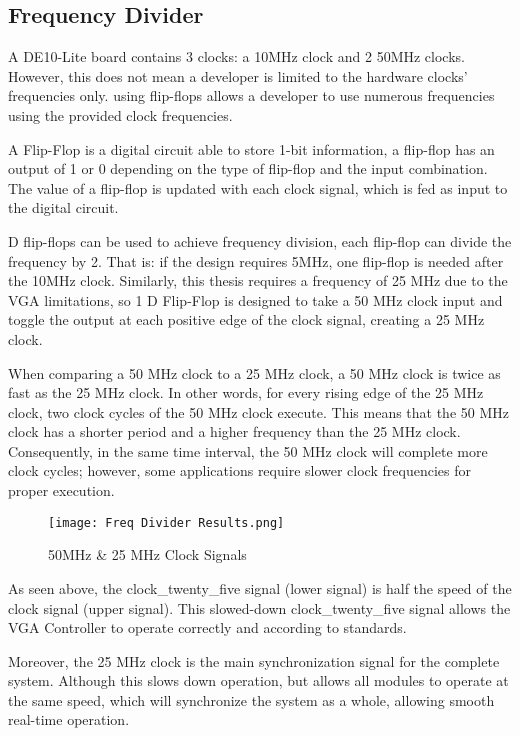 \subsection{Frequency Divider}
\par A DE10-Lite board contains 3 clocks: a 10MHz clock and 2 50MHz clocks. However, this does not mean a developer is limited to the hardware clocks' frequencies only. using flip-flops allows a developer to use numerous frequencies using the provided clock frequencies. \newline
\par A Flip-Flop is a digital circuit able to store 1-bit information, a flip-flop has an output of 1 or 0 depending on the type of flip-flop and the input combination. The value of a flip-flop is updated with each clock signal, which is fed as input to the digital circuit. \newline
\par D flip-flops can be used to achieve frequency division, each flip-flop can divide the frequency by 2. That is: if the design requires 5MHz, one flip-flop is needed after the 10MHz clock. Similarly, this thesis requires a frequency of 25 MHz due to the VGA limitations, so 1 D Flip-Flop is designed to take a 50 MHz clock input and toggle the output at each positive edge of the clock signal, creating a 25 MHz clock. \newline
\par When comparing a 50 MHz clock to a 25 MHz clock, a 50 MHz clock is twice as fast as the 25 MHz clock. In other words, for every rising edge of the 25 MHz clock, two clock cycles of the 50 MHz clock execute. This means that the 50 MHz clock has a shorter period and a higher frequency than the 25 MHz clock. Consequently, in the same time interval, the 50 MHz clock will complete more clock cycles; however, some applications require slower clock frequencies for proper execution. \newline

\begin{figure}[H]
    \centering
    \texttt{[image: Freq Divider Results.png]}
    \caption{50MHz \& 25 MHz Clock Signals }
    \label{fig:5025Res}  
\end{figure}

\par As seen above, the clock\_twenty\_five signal (lower signal) is half the speed of the clock signal (upper signal). This slowed-down clock\_twenty\_five signal allows the VGA Controller to operate correctly and according to standards. \newline
\par Moreover, the 25 MHz clock is the main synchronization signal for the complete system. Although this slows down operation, but allows all modules to operate at the same speed, which will synchronize the system as a whole, allowing smooth real-time operation.\newline

